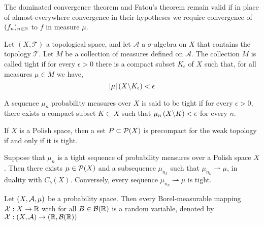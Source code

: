 \begin{corollary}
The dominated convergence theorem and Fatou’s theorem remain valid if in place of almost everywhere convergence in their hypotheses we require convergence of $(f_n)_{n\in \mathbb{N}}$ to $f$ in measure $\mu$.
\end{corollary}



\begin{definition}[Tightness] Let $(X, \mathcal T)$ a topological space, and let $\mathcal A$ a $\sigma$-algebra on $X$ that contains the topology $\mathcal{T}$. Let $M$ be a collection of measures defined on $\mathcal{A}$. The collection $M$ is called tight  if for every $\epsilon>0$ there is a compact subset $K_\epsilon$ of $X$ such that, for all measures $\mu\in M$ we have,
	\begin{equation*}
	\left| \mu \right|\left( X \backslash K_\epsilon \right) < \epsilon
	\end{equation*} 
\end{definition}


\begin{definition}
	A sequence $\mu_n$ probability measures over $X$ is said to be tight if for every $\epsilon> 0$, there exists a compact subset $K\subset X$ such that $\mu_n\left( X\backslash K \right)< \epsilon$ for every $n$.
\end{definition}
\begin{theorem}[Prokhorov]
	If $X$ is a Polish space, then a set $P \subset \mathcal{P}(X)$ is precompact for the weak topology if and only if it is tight.
\end{theorem}

\begin{theorem}
	Suppose that $\mu_n $ is a tight sequence of probability measures over a Polish space $X$. Then there exists $\mu\in\mathcal{P}(X)$ and a subsequence $\mu_{n_k}$ such that $\mu_{n_k}\rightharpoonup \mu $, in duality with $C_b(X)$. Conversely, every sequence $\mu_{n_k}\rightharpoonup \mu$ is tight.
\end{theorem}

\begin{definition}
	Let $\left( X, \mathcal A, \mu \right)$ be a probability space. Then every Borel-measurable mapping $\mathcal{X}: X\rightarrow \mathbb{R}$ with for all $B\in \mathcal B(\mathbb{R}) $ is a random variable, denoted by $\mathcal{X}: \left( X, \mathcal A \right)\rightarrow \left( \mathbb{R}, \mathcal B (\mathbb{R}) \right) $
\end{definition}

